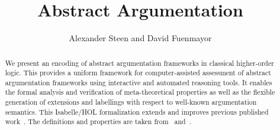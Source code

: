 \documentclass[11pt,a4paper]{article}
\begin{document}
\title{Abstract Argumentation}
\author{Alexander Steen and David Fuenmayor}
\maketitle

\begin{abstract}
  We present an encoding of abstract argumentation frameworks in
  classical higher-order logic. This provides a uniform framework for
computer-assisted assessment of abstract argumentation frameworks using interactive
and automated reasoning tools. It enables the formal analysis and verification
of meta-theoretical properties as well as the flexible generation of extensions and
labellings with respect to well-known argumentation semantics. This Isabelle/HOL
formalization extends and improves previous published work~\cite{steen2024formalization}.
The definitions and properties are taken
from~\cite{DBLP:journals/ai/Dung95} and~\cite{DBLP:journals/ker/BaroniCG11}.
\end{abstract}

\tableofcontents





\end{document}
